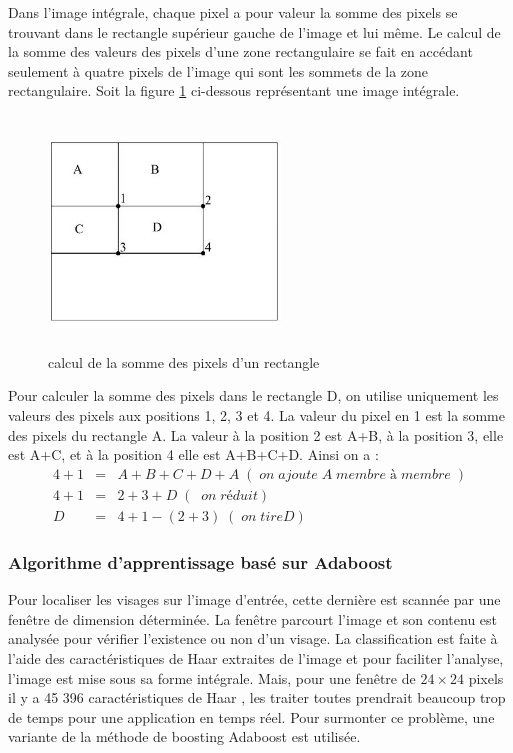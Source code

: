 Dans l'image intégrale, chaque pixel a pour valeur la somme des pixels se trouvant dans le rectangle supérieur gauche de l'image et lui même. Le calcul de la somme des valeurs des pixels d'une zone rectangulaire se fait en accédant seulement à quatre pixels de l'image qui sont les sommets de la zone rectangulaire. Soit la figure \ref{fig:rect} ci-dessous représentant une image intégrale.
\begin{figure}[htbp]
	\centering
		\includegraphics[height=175pt, width=175pt]{rect.JPG}
	\caption{calcul de la somme des pixels d'un rectangle}
	\label{fig:rect}
\end{figure}
Pour calculer la somme des pixels dans le rectangle D, on utilise uniquement les valeurs des pixels aux positions 1, 2, 3 et 4. La valeur du pixel en 1 est la somme des pixels du rectangle A. La valeur à la position 2 est A+B, à la position 3, elle est A+C, et à la position 4 elle est A+B+C+D. Ainsi on a : 
\begin{eqnarray*}
			4+1  & = &A+B+C+D+A \; (\; on\;  ajoute\;  A \; membre\;  à\;  membre\; )\\
			4+1  & = &2+3+D  \; (\; \; on \; réduit )\\
      D    & = &4+1-(2+3)\; (\; on\; tire D )
\end{eqnarray*}
														

	\subsubsection{Algorithme d'apprentissage basé sur Adaboost}
Pour localiser les visages sur l'image d'entrée, cette dernière est scannée par une fenêtre de dimension déterminée. La fenêtre parcourt l'image et son contenu est analysée pour vérifier l'existence ou non d'un visage. La classification est faite à l'aide des caractéristiques de Haar extraites de l'image et pour faciliter l'analyse, l'image est mise sous sa forme intégrale. Mais, pour une fenêtre de $24 \times 24$ pixels il y a 45 396 caractéristiques de Haar \citep{VIO}, les traiter toutes prendrait beaucoup trop de temps pour une application en temps réel. Pour surmonter ce problème, une variante de la méthode de boosting Adaboost est utilisée.

